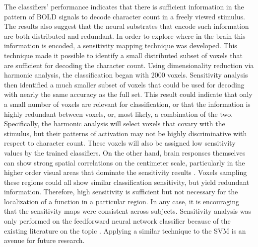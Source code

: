 \documentclass[5p,authoryear]{elsarticle}
\begin{document}
The classifiers' performance indicates that there is sufficient information in the pattern of BOLD signals to decode character count in a freely viewed stimulus. 
The results also suggest that the neural substrates that encode such information are both distributed and redundant.
In order to explore where in the brain this information is encoded, a sensitivity mapping technique was developed.
This technique made it possible to identify a small distributed subset of voxels that are sufficient for decoding the character count.
Using dimensionality reduction via harmonic analysis, the classification began with 2000 voxels.
Sensitivity analysis then identified a much smaller subset of voxels that could be used for decoding with nearly the same accuracy as the full set.
This result could indicate that only a small number of voxels are relevant for classification, or that the information is highly redundant between voxels, or, most likely, a combination of the two.
Specifically, the harmonic analysis will select voxels that covary with the stimulus, but their patterns of activation may not be highly discriminative with respect to character count.
These voxels will also be assigned low sensitivity values by the trained classifiers.
On the other hand, brain responses themselves can show strong spatial correlations on the centimeter scale, particularly in the higher order visual areas that dominate the sensitivity results \citep{Engel1997}. 
Voxels sampling these regions could all show similar classification sensitivity, but yield redundant information.
Therefore, high sensitivity is sufficient but not necessary for the localization of a function in a particular region.
In any case, it is encouraging that the sensitivity maps were consistent across subjects.
Sensitivity analysis was only performed on the feedforward neural network classifier because of the existing literature on the topic \citep{Zurada1994}.
Applying a similar technique to the SVM is an avenue for future research.
\end{document}
